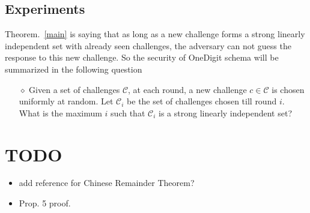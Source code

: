 \documentclass{article}
\begin{document}
\subsection{Experiments}

Theorem.~\ref{main} is saying that as long as a new challenge forms a strong linearly independent set with already seen challenges, the adversary can not guess the response to this new challenge. So the security of OneDigit schema will be summarized in the following question
\begin{itemize}
	\item[$\diamond$] Given a set of challenges $\mathcal{C}$, at each round, a new challenge $c \in \mathcal{C}$ is chosen uniformly at random. Let $\mathcal{C}_i$ be the set of challenges chosen till round $i$. What is the maximum $i$
	such that $\mathcal{C}_i$ is a strong linearly independent set?
	\end{itemize}


\section{TODO}
\begin{itemize}
\item add reference for Chinese Remainder Theorem?	
\item Prop. 5 proof.
\end{itemize}
\end{document}
